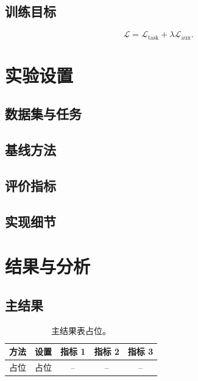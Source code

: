 \documentclass[journal]{IEEEtran}
\begin{document}
\subsection{训练目标}

\begin{equation}
    \mathcal{L} = \mathcal{L}_{\mathrm{task}} + \lambda \mathcal{L}_{\mathrm{aux}} .
    \label{eq:objective}
\end{equation}

\section{实验设置}

\subsection{数据集与任务}

\subsection{基线方法}

\subsection{评价指标}

\subsection{实现细节}

\section{结果与分析}

\subsection{主结果}

\begin{table}[!t]
    \centering
    \caption{主结果表占位。}
    \label{tab:main_results}
    \begin{tabular}{lcccc}
        \toprule
        方法 & 设置 & 指标 1 & 指标 2 & 指标 3 \\
        \midrule
        占位 & 占位 & -- & -- & -- \\
        \bottomrule
    \end{tabular}
\end{table}
\end{document}
